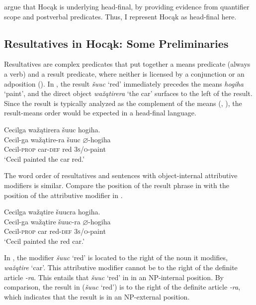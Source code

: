 \documentclass[output=paper]{LSP/langsci}
\begin{document}
\citet{JohnsonRosen2014} argue that Hocąk is underlying head-final, by providing evidence from quantifier scope and postverbal predicates. Thus, I represent Hocąk as head-final here.

\subsection{Resultatives in Hocąk: Some Preliminaries}

Resultatives are complex predicates that put together a means predicate (always a verb) and a result predicate, where neither is licensed by a conjunction or an adposition (\citealt{Williams2008}). In , the result \textit{šuuc} `red' immediately precedes the means \textit{hogiha} `paint', and the direct object \textit{wažątirera} `the car' surfaces to the left of the result. Since the result is typically analyzed as the complement of the means (\citealt{Li1999}, \citealt{Williams2008}), the result-means order would be expected in a head-final language.

\begin{exe}

\ex \label{ex:rosen:7}\glll Cecilga wažątirera šuuc hogiha. \\
Cecil-ga  wažątire-ra šuuc {$\varnothing$}-hogiha \\
Cecil-\textsc{prop} car-\textsc{def} red \textsc{3s/o}-paint\\
\glt `Cecil painted the car red.'

\end{exe}

The word order of resultatives and sentences with object-internal attributive modifiers is similar. Compare the position of the result phrase in  with the position of the attributive modifier in .

\begin{exe}
\ex\label{ex:rosen:8}
 \glll Cecilga wažątire šuucra hogiha. \\
Cecil-ga  wažątire šuuc-ra  {$\varnothing$}-hogiha\\
Cecil-\textsc{prop} car red-\textsc{def}  \textsc{3s/o}-paint\\
\glt `Cecil painted the red car.'

\end{exe}

In , the modifier \textit{šuuc} `red' is located to the right of the noun it modifies, \textit{wažątire} `car'. This attributive modifier cannot be to the right of the definite article \textit{-ra}. This entails that \textit{šuuc} `red' in  in an NP-internal position. By comparison, the result in  (\textit{šuuc} `red') is to the right of the definite article \textit{-ra}, which indicates that the result is in an NP-external position.
\end{document}
